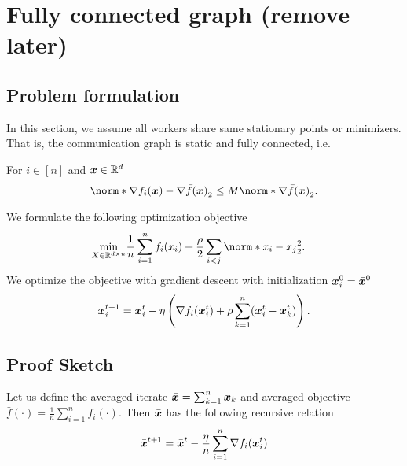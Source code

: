 \documentclass{article}
\begin{document}
\section{Fully connected graph (remove later)}
\subsection{Problem formulation}
In this section, we assume all workers share same stationary points or minimizers. That is, the communication graph is static and fully connected, i.e.
\begin{assumption}\label{a:strong-growth:1}
  For $i\in[n]$ and $\bm{x}\in\mathbb{R}^d$
  \begin{align*}
    \norm*{\nabla f_i(\xx) - \nabla \bar{f}(\xx)}_2 \le M \norm*{\nabla \bar{f}(\xx)}_2.
  \end{align*}
\end{assumption}
We formulate the following optimization objective
\begin{align*}
  \min_{X\in\mathbb{R}^{d\times n}}&  \frac{1}{n} \sum_{i=1}^n f_i(x_i) + \frac{\rho}{2} \sum_{i<j} \norm*{x_{i} - x_{j}}_2^2.
\end{align*}
We optimize the objective with gradient descent with initialization $\bm{x}_i^0=\bar{\bm{x}}^0$
\begin{equation}\label{eq:x:gd:1}
    \bm{x}_i^{t+1}=\bm{x}_i^t - \eta \left(
      \nabla f_i(\bm{x}^t_i) + \rho \sum_{k=1}^n (\bm{x}^t_i - \bm{x}^t_k)
    \right).
\end{equation}

\subsection{Proof Sketch}
Let us define the averaged iterate $\bar{\bm{x}}=\sum_{k=1}^n \bm{x}_k$ and averaged objective $\bar{f}(\cdot)=\frac{1}{n}\sum_{i=1}^n f_i(\cdot)$. Then $\bar{\bm{x}}$ has the following recursive relation
\begin{equation}\label{eq:barx:gd:1}
  \bar{\bm{x}}^{t+1} = \bar{\bm{x}}^t - \frac{\eta}{n} \sum_{i=1}^n \nabla f_i(\bm{x}^t_i)
\end{equation}
\end{document}
